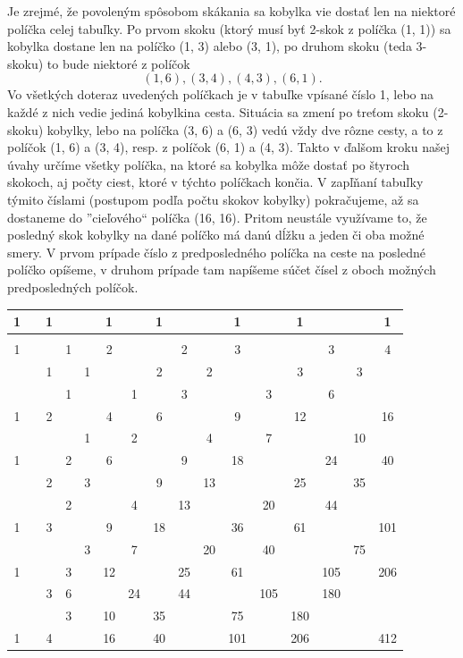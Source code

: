 \documentclass[11pt,a4paper,oneside,final]{book}
\begin{document}
Je zrejmé, že povoleným spôsobom skákania sa kobylka vie dostať len na niektoré políčka celej tabuľky. Po prvom skoku (ktorý musí byť 2-skok z políčka (1, 1)) sa kobylka dostane len na políčko (1, 3) alebo (3, 1), po druhom skoku (teda 3-skoku) to bude niektoré z políčok
$$(1, 6), (3, 4), (4, 3), (6, 1).$$
Vo všetkých doteraz uvedených políčkach je v tabuľke vpísané číslo 1, lebo na každé z nich vedie jediná kobylkina cesta. Situácia sa zmení po treťom skoku (2-skoku) kobylky, lebo na políčka (3, 6) a (6, 3) vedú vždy dve rôzne cesty, a to z políčok (1, 6) a (3, 4), resp. z políčok (6, 1) a (4, 3). Takto v ďalšom kroku našej úvahy určíme všetky políčka, na ktoré sa kobylka môže dostať po štyroch skokoch, aj počty ciest, ktoré v týchto políčkach končia. V zapľňaní tabuľky týmito číslami (postupom podľa počtu skokov kobylky) pokračujeme, až sa dostaneme do ”cieľového“ políčka (16, 16). Pritom neustále využívame to, že posledný skok kobylky na dané políčko má danú dĺžku a jeden či oba možné smery. V prvom prípade číslo z predposledného políčka na ceste na posledné políčko opíšeme, v druhom prípade tam napíšeme súčet čísel z oboch možných predposledných políčok.
\begin{center}
\begin{tabular}{|c|c|c|c|c|c|c|c|c|c|c|c|c|c|c|c|}
\hline
1 & & 1 & & & 1 & & 1 & & & 1 & & 1 & & & 1 \\
\hline
& & & & & & & & & & & & & & & \\
\hline
1 & & & 1 & & 2 & & & 2 & & 3 & & & 3 & & 4\\
\hline
& & 1 & & 1 & & & 2 & & 2 & & & 3 & & 3 & \\
\hline
& & & 1 & & & 1 & & 3 & & & 3 & & 6 & & \\
\hline
1 & & 2 & & & 4 & & 6 & & & 9 & & 12 & & & 16\\
\hline
& & & & 1 & & 2 & & & 4 & & 7 & & & 10 & \\
\hline
1 & & & 2 & & 6 & & & 9 & & 18 & & & 24 & & 40\\
\hline
& & 2 & & 3 & & & 9 & & 13 & & & 25 & & 35 & \\
\hline
& & & 2 & & & 4 & & 13 & & & 20 & & 44 & & \\
\hline
1 & & 3 & & & 9 & & 18 & & & 36 & & 61 & & & 101\\
\hline
& & & & 3 & & 7 & & & 20 & & 40 & & & 75 & \\
\hline
1 & & & 3 & & 12 & & & 25 & & 61 & & & 105 & & 206\\
\hline
& & 3 & 6 & & & 24 & & 44 & & & 105 & & 180 & \\
\hline
& & & 3 & & 10 & & 35 & & & 75 & & 180 & & \\
\hline
1 & & 4 & & & 16 & & 40 & & & 101 & & 206 & & & 412\\
\hline
\end{tabular}
\end{center}
\end{document}
